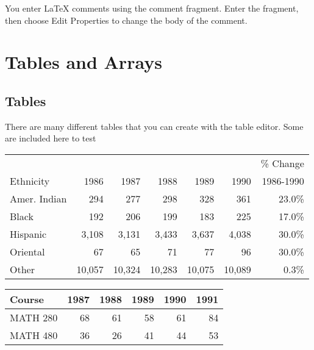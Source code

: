 \documentclass{article}
\begin{document}
You enter \LaTeX{} comments using the comment fragment. Enter the fragment,
then choose Edit Properties to change the body of the comment.%
%
%

\section{Tables and Arrays}

\subsection{Tables}

There are many different tables that you can create with the table editor.
Some are included here to test

\begin{center}
\begin{tabular}{|lrrrrrr|}
\hline
&  &  &  &  &  & \% Change \\ 
Ethnicity & 1986 & 1987 & 1988 & 1989 & 1990 & 1986-1990 \\ \hline
Amer. Indian & 294 & 277 & 298 & 328 & 361 & 23.0\% \\ 
Black & 192 & 206 & 199 & 183 & 225 & 17.0\% \\ 
Hispanic & 3,108 & 3,131 & 3,433 & 3,637 & 4,038 & 30.0\% \\ 
Oriental & 67 & 65 & 71 & 77 & 96 & 30.0\% \\ 
Other & 10,057 & 10,324 & 10,283 & 10,075 & 10,089 & 0.3\% \\ \hline
\end{tabular}

\begin{tabular}{|l|rrrrr|}
\hline
Course & 1987 & 1988 & 1989 & 1990 & 1991 \\ \hline
MATH 280 & 68 & 61 & 58 & 61 & 84 \\ \hline
MATH 480 & 36 & 26 & 41 & 44 & 53 \\ \hline
\end{tabular}
\end{center}
\end{document}
